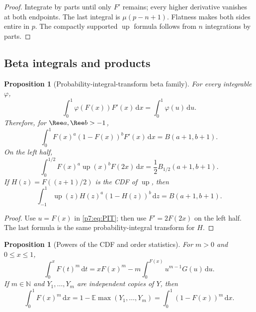 \documentclass[11pt,oneside]{article}
\newtheorem{proposition}[theorem]{Proposition}
\theoremstyle{definition}
\theoremstyle{remark}
\newcommand{\Up}{\operatorname{up}}
\newcommand{\E}{\mathbb E}
\newcommand{\N}{\mathbb N}
\newcommand{\dd}{\,\mathrm d}
\newcommand{\1}{\mathbf 1}
\begin{document}
\begin{proof}
Integrate by parts until only $F'$ remains; every higher derivative vanishes at both endpoints.
The last integral is $\mu(p-n+1)$.  Flatness makes both sides entire in $p$.  The compactly
supported $\Up$ formula follows from $n$ integrations by parts.
\end{proof}

\subsection{Beta integrals and products}

\begin{proposition}[Probability-integral-transform beta family]
\label{p7:prop:beta-family}
For every integrable $\varphi$,
\begin{equation}
 \int_0^1\varphi(F(x))F'(x)\dd x=\int_0^1\varphi(u)\dd u.
 \label{p7:eq:PIT}
\end{equation}
Therefore, for $\Ree a,\Ree b>-1$,
\begin{equation}
 \int_0^1F(x)^a(1-F(x))^bF'(x)\dd x
 =B(a+1,b+1).
 \label{p7:eq:beta-F}
\end{equation}
On the left half,
\begin{equation}
 \int_0^{1/2}F(x)^a\Up(x)^bF(2x)\dd x
 =\frac12B_{1/2}(a+1,b+1).
 \label{p7:eq:incomplete-beta-left}
\end{equation}
If $H(z)=F((z+1)/2)$ is the CDF of $\Up$, then
\begin{equation}
 \int_{-1}^{1}\Up(z)H(z)^a(1-H(z))^b\dd z
 =B(a+1,b+1).
 \label{p7:eq:beta-up-CDF}
\end{equation}
\end{proposition}

\begin{proof}
Use $u=F(x)$ in \cref{p7:eq:PIT}; then use $F'=2F(2x)$ on the left half.  The last formula is
the same probability-integral transform for $H$.
\end{proof}

\begin{proposition}[Powers of the CDF and order statistics]
\label{p7:prop:CDF-powers}
For $m>0$ and $0\le x\le1$,
\begin{equation}
 \int_0^xF(t)^m\dd t
 =xF(x)^m-m\int_0^{F(x)}u^{m-1}G(u)\dd u.
 \label{p7:eq:CDF-power-primitive}
\end{equation}
If $m\in\N$ and $Y_1,\ldots,Y_m$ are independent copies of $Y$, then
\begin{equation}
 \int_0^1F(x)^m\dd x
 =1-\E\max(Y_1,\ldots,Y_m)
 =\int_0^1(1-F(x))^m\dd x.
 \label{p7:eq:CDF-power-order-stat}
\end{equation}
\end{proposition}
\end{document}
